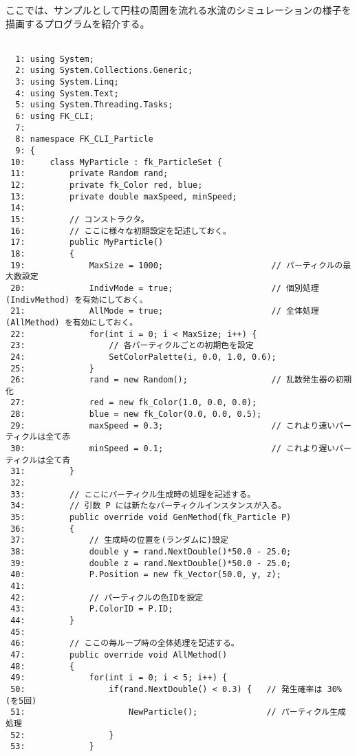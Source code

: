 ここでは、サンプルとして円柱の周囲を流れる水流のシミュレーションの様子を
描画するプログラムを紹介する。\\ ~

\begin{breakbox}
\begin{small}
\begin{verbatim}
  1: using System;
  2: using System.Collections.Generic;
  3: using System.Linq;
  4: using System.Text;
  5: using System.Threading.Tasks;
  6: using FK_CLI;
  7: 
  8: namespace FK_CLI_Particle
  9: {
 10:     class MyParticle : fk_ParticleSet {
 11:         private Random rand;
 12:         private fk_Color red, blue;
 13:         private double maxSpeed, minSpeed;
 14: 
 15:         // コンストラクタ。
 16:         // ここに様々な初期設定を記述しておく。
 17:         public MyParticle()
 18:         {
 19:             MaxSize = 1000;                      // パーティクルの最大数設定
 20:             IndivMode = true;                    // 個別処理 (IndivMethod) を有効にしておく。
 21:             AllMode = true;                      // 全体処理 (AllMethod) を有効にしておく。
 22:             for(int i = 0; i < MaxSize; i++) {
 23:                 // 各パーティクルごとの初期色を設定
 24:                 SetColorPalette(i, 0.0, 1.0, 0.6);
 25:             }
 26:             rand = new Random();                 // 乱数発生器の初期化
 27:             red = new fk_Color(1.0, 0.0, 0.0);
 28:             blue = new fk_Color(0.0, 0.0, 0.5);
 29:             maxSpeed = 0.3;                      // これより速いパーティクルは全て赤
 30:             minSpeed = 0.1;                      // これより遅いパーティクルは全て青
 31:         }
 32:         
 33:         // ここにパーティクル生成時の処理を記述する。
 34:         // 引数 P には新たなパーティクルインスタンスが入る。
 35:         public override void GenMethod(fk_Particle P)
 36:         {
 37:             // 生成時の位置を(ランダムに)設定
 38:             double y = rand.NextDouble()*50.0 - 25.0;
 39:             double z = rand.NextDouble()*50.0 - 25.0;
 40:             P.Position = new fk_Vector(50.0, y, z);
 41: 
 42:             // パーティクルの色IDを設定
 43:             P.ColorID = P.ID;
 44:         }
 45: 
 46:         // ここの毎ループ時の全体処理を記述する。
 47:         public override void AllMethod()
 48:         {
 49:             for(int i = 0; i < 5; i++) {
 50:                 if(rand.NextDouble() < 0.3) {   // 発生確率は 30% (を5回)
 51:                     NewParticle();              // パーティクル生成処理
 52:                 }
 53:             }

\end{verbatim}
\end{small}
\end{breakbox}
